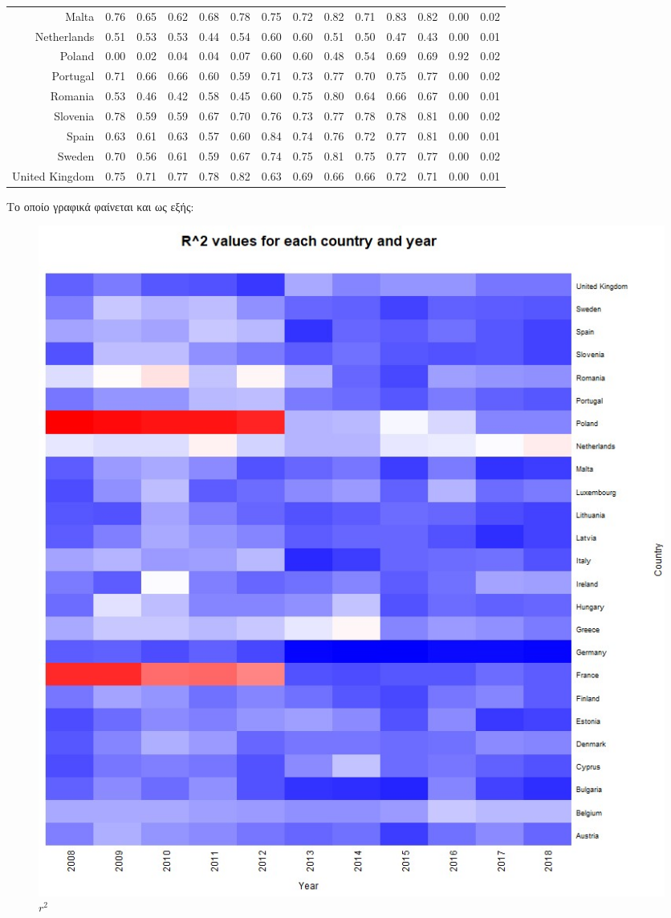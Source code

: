 \documentclass[a4paper,twoside,10pt]{article}
\begin{document}
\begin{table}[H]
\begin{tabular}{rrrrrrrrrrrrrr}
			Malta & 0.76 & 0.65 & 0.62 & 0.68 & 0.78 & 0.75 & 0.72 & 0.82 & 0.71 & 0.83 & 0.82 & 0.00 & 0.02 \\
			Netherlands & 0.51 & 0.53 & 0.53 & 0.44 & 0.54 & 0.60 & 0.60 & 0.51 & 0.50 & 0.47 & 0.43 & 0.00 & 0.01 \\
			\rowcolor{lightgray} Poland & 0.00 & 0.02 & 0.04 & 0.04 & 0.07 & 0.60 & 0.60 & 0.48 & 0.54 & 0.69 & 0.69 & 0.92 & 0.02 \\
			Portugal & 0.71 & 0.66 & 0.66 & 0.60 & 0.59 & 0.71 & 0.73 & 0.77 & 0.70 & 0.75 & 0.77 & 0.00 & 0.02 \\ 
			Romania & 0.53 & 0.46 & 0.42 & 0.58 & 0.45 & 0.60 & 0.75 & 0.80 & 0.64 & 0.66 & 0.67 & 0.00 & 0.01 \\
			Slovenia & 0.78 & 0.59 & 0.59 & 0.67 & 0.70 & 0.76 & 0.73 & 0.77 & 0.78 & 0.78 & 0.81 & 0.00 & 0.02 \\ 
			Spain & 0.63 & 0.61 & 0.63 & 0.57 & 0.60 & 0.84 & 0.74 & 0.76 & 0.72 & 0.77 & 0.81 & 0.00 & 0.01 \\
			Sweden & 0.70 & 0.56 & 0.61 & 0.59 & 0.67 & 0.74 & 0.75 & 0.81 & 0.75 & 0.77 & 0.77 & 0.00 & 0.02 \\ 
			United Kingdom & 0.75 & 0.71 & 0.77 & 0.78 & 0.82 & 0.63 & 0.69 & 0.66 & 0.66 & 0.72 & 0.71 & 0.00 & 0.01 \\
			\hline
		\end{tabular}
	\end{table}
	Το οποίο γραφικά φαίνεται και ως εξής:
	\begin{figure}[H]
		\centering
		\includegraphics[width = \textwidth]{images/plot.jpg}
		\caption{$r^2$}
		\label{fig:/2017 r^2 vs GDP}
	\end{figure}
	
\end{document}
